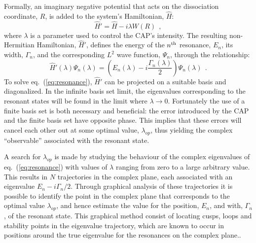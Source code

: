 \documentclass[12pt]{article}
\newcommand{\2}{$_{2}$}
\newcommand{\3}{$_{3}$}
\newcommand{\4}{$_{4}$}
\begin{document}
Formally, an imaginary negative potential that acts on the
dissociation coordinate, $R$, is added to the system's Hamiltonian,
$\hat{H}$:
%
\begin{equation} \label{eq:CAP}
\hat{H}'= \hat{H} - i\lambda W(R)\ \ ,
\end{equation}
%
where $\lambda$ is a parameter used to control the CAP's
intensity. The resulting non-Hermitian Hamiltonian, $\hat{H}'$,
defines the energy of the $n^{\rm th}$ resonance, $E_n$, its width,
$\Gamma_n$, and the corresponding $L^2$ wave function, $\Psi_n$,
through the relationship:
%
\begin{equation} \label{eq:resonance}
  \hat{H}'(\lambda)\Psi_n(\lambda)= \left(E_n(\lambda) - i\frac{\Gamma_n(\lambda)}{2}\right)\Psi_n(\lambda)\ \ .
\end{equation}
%
To solve eq.~(\ref{eq:resonance}), $\hat{H}'$ can be projected on a suitable
basis and diagonalized. In the infinite basis set limit, the
eigenvalues corresponding to the resonant states will be found in the
limit where $\lambda \rightarrow 0$. Fortunately the use of a finite
basis set is both necessary and beneficial: the error introduced by
the CAP and the finite basis set have opposite phase. This implies
that these errors will cancel each other out at some optimal value,
$\lambda_{op}$, thus yielding the complex ``observable'' associated
with the resonant state.

A search for $\lambda_{op}$ is made by studying the behaviour of the
complex eigenvalues of eq.~(\ref{eq:resonance}) with values of
$\lambda$ ranging from zero to a large arbitrary value. This results in
$N$ trajectories in the complex plane, each associated with an
eigenvalue $E_n - i\Gamma_n/2$.  Through graphical analysis of these
trajectories it is possible to identify the point in the complex plane
that corresponds to the optimal value $\lambda_{op}$, and hence
estimate the value for the position, $E_n$, and with, $\Gamma_n$, of
the resonant state. This graphical method consist of locating cusps,
loops and stability points in the eigenvalue trajectory, which are
known to occur in positions around the true eigenvalue for the
resonances on the complex plane.\cite{jt443,81MoFrCe}.
\end{document}
